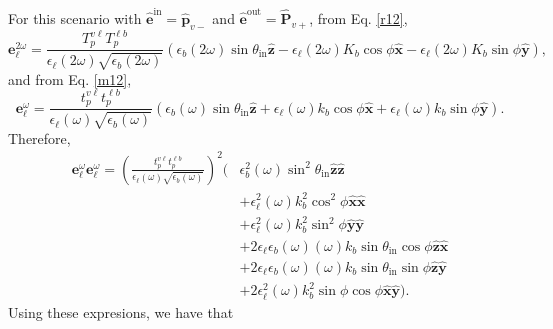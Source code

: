 For this scenario with $\hat{\mathbf{e}}^{\mathrm{in}}=\hat{\mathbf{p}}_{v-}$
and $\hat{\mathbf{e}}^{\mathrm{out}}=\hat{\mathbf{P}}_{v+}$, from Eq.
\eqref{r12},
\begin{equation*}
\mathbf{e}^{2\omega}_{\ell} =
\frac{T^{v\ell}_{p}T^{\ell b}_{p}}
     {\epsilon_{\ell}({2\omega})\sqrt{\epsilon_{b}(2\omega)}}
\left(
  \epsilon_{b}(2\omega)\sin\theta_{\mathrm{in}}\hat{\mathbf{z}}
- \epsilon_{\ell}(2\omega)K_{b}\cos\phi\hat{\mathbf{x}}
- \epsilon_{\ell}(2\omega)K_{b}\sin\phi\hat{\mathbf{y}}
\right),
\end{equation*}
and from Eq. \eqref{m12},
\begin{equation*}
\mathbf{e}^{\omega}_{\ell}
= \frac{t^{v\ell}_{p}t^{\ell b}_{p}}
       {\epsilon_{\ell}(\omega)\sqrt{\epsilon_{b}(\omega)}}
\left(
  \epsilon_{b}(\omega)\sin\theta_{\mathrm{in}}\hat{\mathbf{z}}
+ \epsilon_{\ell}(\omega)k_{b}\cos\phi\hat{\mathbf{x}}
+ \epsilon_{\ell}(\omega)k_{b}\sin\phi\hat{\mathbf{y}}
\right).
\end{equation*}
Therefore,
\begin{equation*}
\begin{split}
\mathbf{e}^{\omega}_{\ell}\mathbf{e}^{\omega}_{\ell}
= \left(\frac{t^{v\ell}_{p}t^{\ell b}_{p}}
{\epsilon_{\ell}(\omega)\sqrt{\epsilon_{b}(\omega)}}\right)^{2}
\big(
&  \epsilon_{b}^{2}(\omega)\sin^{2}\theta_{\mathrm{in}}
   \hat{\mathbf{z}}\hat{\mathbf{z}}\\
&+ \epsilon_{\ell}^{2}(\omega)k^{2}_{b}\cos^{2}\phi
   \hat{\mathbf{x}}\hat{\mathbf{x}}\\
&+ \epsilon_{\ell}^{2}(\omega)k^{2}_{b}\sin^{2}\phi
   \hat{\mathbf{y}}\hat{\mathbf{y}}\\
&+ 2\epsilon_{\ell}\epsilon_{b}(\omega)(\omega)k_{b}
   \sin\theta_{\mathrm{in}}\cos\phi\hat{\mathbf{z}}\hat{\mathbf{x}}\\
&+ 2\epsilon_{\ell}\epsilon_{b}(\omega)(\omega)k_{b}
   \sin\theta_{\mathrm{in}}\sin\phi\hat{\mathbf{z}}\hat{\mathbf{y}}\\
&+ 2\epsilon^{2}_{\ell}(\omega)k^{2}_{b}\sin\phi\cos\phi
   \hat{\mathbf{x}}\hat{\mathbf{y}}
\big).
\end{split}
\end{equation*}
Using these expresions, we have that
